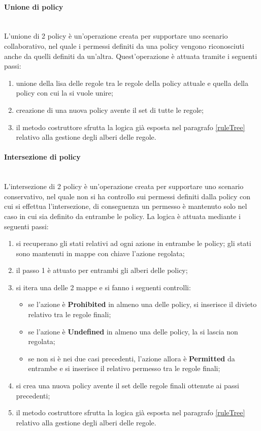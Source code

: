 \documentclass[12pt,a4paper,twoside]{book}
\begin{document}
\paragraph{Unione di policy}\mbox{}\\
L'unione di 2 policy è un'operazione creata per supportare uno scenario collaborativo, nel quale i permessi definiti da una policy vengono riconosciuti anche da quelli definiti da un'altra. Quest'operazione è attuata tramite i seguenti passi:
\begin{enumerate}
\item unione della lisa delle regole tra le regole della policy attuale e quella della policy con cui la si vuole unire;
\item creazione di una nuova policy avente il set di tutte le regole;
\item il metodo costruttore sfrutta la logica già esposta nel paragrafo \ref{ruleTree} relativo alla gestione degli alberi delle regole.
\end{enumerate}
\paragraph{Intersezione di policy}\mbox{}\\
L'intersezione di 2 policy è un'operazione creata per supportare uno scenario conservativo, nel quale non si ha controllo sui permessi definiti dalla policy con cui si effettua l'intersezione, di conseguenza un permesso è mantenuto solo nel caso in cui sia definito da entrambe le policy. La logica è attuata mediante i seguenti passi:
\begin{enumerate}
\item si recuperano gli stati relativi ad ogni azione in entrambe le policy; gli stati sono mantenuti in mappe con chiave l'azione regolata;
\item il passo 1 è attuato per entrambi gli alberi delle policy;
\item si itera una delle 2 mappe e si fanno i seguenti controlli:
\begin{itemize}
\item se l'azione è \textbf{Prohibited} in almeno una delle policy, si inserisce il divieto relativo tra le regole finali;
\item se l'azione è \textbf{Undefined} in almeno una delle policy, la si lascia non regolata;
\item se non si è nei due casi precedenti, l'azione allora è \textbf{Permitted} da entrambe e si inserisce il relativo permesso tra le regole finali;
\end{itemize}
\item si crea una nuova policy avente il set delle regole finali ottenute ai passi precedenti;
\item il metodo costruttore sfrutta la logica già esposta nel paragrafo \ref{ruleTree} relativo alla gestione degli alberi delle regole.
\end{enumerate}
\end{document}
